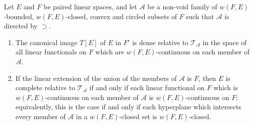 Let $E$ and $F$ be paired linear spaces, and let $\mathcal{A}$ be a non-void family of $w(F, E)$-bounded, $w(F, E)$-closed, convex and circled subsets of $F$ such that $\mathcal{A}$ is directed by $\supset$.

\begin{enumerate}
\item[(i)] The canonical image $T[E]$ of $E$ in $F'$ is dense relative to $\mathcal{T}_{\mathcal{A}}$ in the space of all linear functionals on $F$ which are $w(F, E)$-continuous on each member of $\mathcal{A}$.

\item[(ii)] If the linear extension of the union of the members of $\mathcal{A}$ is $F$, then $E$ is complete relative to $\mathcal{T}_{\mathcal{A}}$ if and only if each linear functional on $F$ which is $w(F, E)$-continuous on each member of $\mathcal{A}$ is $w(F, E)$-continuous on $F$; equivalently, this is the case if and only if each hyperplane which intersects every member of $\mathcal{A}$ in a $w(F, E)$-closed set is $w(F, E)$-closed.
\end{enumerate}
